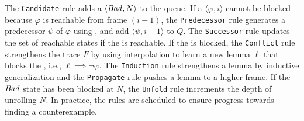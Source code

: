 


The \texttt{Candidate} rule adds a \pob $\langle \mathit{Bad}, N \rangle$ to
the queue. If a \pob $\langle \varphi, i \rangle$ cannot be blocked because
$\varphi$ is reachable from frame $(i-1)$, the \texttt{Predecessor} rule
generates a predecessor $\psi$ of $\varphi$ using \getP, and add $\langle \psi,
i-1 \rangle$ to $Q$. The \texttt{Successor} rule updates the set of reachable
states if the \pob is reachable. If the \pob is blocked, the \texttt{Conflict}
rule strengthens the trace $F$ by using interpolation to learn a new lemma
$\ell$ that blocks the \pob, i.e., $\ell \implies \neg \varphi$. The
\texttt{Induction} rule strengthens a lemma by inductive generalization and the
\texttt{Propagate} rule pushes a lemma to a higher frame. If the $\mathit{Bad}$ state
has been blocked at $N$, the \texttt{Unfold} rule increments the depth of
unrolling $N$. In practice, the rules are scheduled to ensure progress towards
finding a counterexample.

